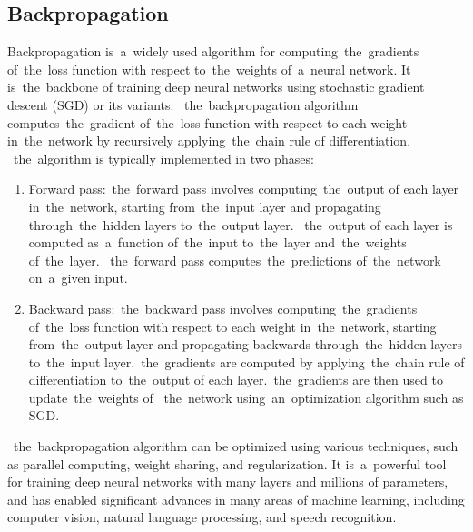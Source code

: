         \subsection{Backpropagation}\label{subsec:lp}
        Backpropagation is~a~widely used algorithm for computing~the~gradients of~the~loss function with
        respect to~the~weights of~a~neural network. It is~the~backbone of training deep neural networks using
        stochastic gradient descent (SGD) or its variants.
       ~the~backpropagation algorithm computes~the~gradient of~the~loss function with respect to each
        weight in~the~network by recursively applying~the~chain rule of differentiation.
       ~the~algorithm is typically implemented in two phases:
        \begin{enumerate}
            \item Forward pass:~the~forward pass involves computing~the~output of each layer in~the~network,
            starting from~the~input layer and propagating through~the~hidden layers to~the~output layer.
           ~the~output of each layer is computed as~a~function of~the~input to~the~layer and~the~weights of~the~layer.
           ~the~forward pass computes~the~predictions of~the~network on~a~given input.
            \item Backward pass:~the~backward pass involves computing~the~gradients of~the~loss function with
            respect to each weight in~the~network, starting from~the~output layer and propagating backwards
            through~the~hidden layers to~the~input layer.~the~gradients are computed by applying~the~chain rule of
            differentiation to~the~output of each layer.~the~gradients are then used to update~the~weights of
           ~the~network using~an~optimization algorithm such as SGD.
        \end{enumerate}
       ~the~backpropagation algorithm can be optimized using various techniques, such as parallel computing, weight
        sharing, and regularization. It is~a~powerful tool for training deep neural networks with many layers and
        millions of parameters, and has enabled significant advances in many areas of machine learning, including
        computer vision, natural language processing, and speech recognition.
